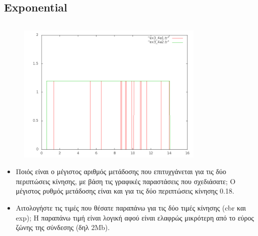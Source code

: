 \documentclass[a4paper,9pt]{article}
\begin{document}
\subsection{Exponential}
\inputminted[fontsize=\footnotesize]{tcl}{files/ex3_4a2.tcl}
\begin{figure}[h]
    \centering
    \includegraphics[width=0.8\textwidth]{files/graph2.png}
\end{figure}

\begin{itemize}
\item Ποιός είναι ο μέγιστος αριθμός μετάδοσης που επιτυχγάνεται για τις δύο
περιπτώσεις κίνησης, με βάση τις γραφικές παραστάσεις που σχεδιάσατε;
Ο μέγιστος ρυθμός μετάδοσης είναι και για τις δύο περιπτώσεις κίνησης 0.18.
\item Αιτολογήστε τις τιμές που θέσατε παραπάνω για τις δύο τιμές κίνησης (cbr
και exp);
H παραπάνω τιμή είναι λογική αφού είναι ελαφρώς μικρότερη από το εύρος ζώνης
της σύνδεσης (δηλ 2Mb).
\end{itemize}
\end{document}
